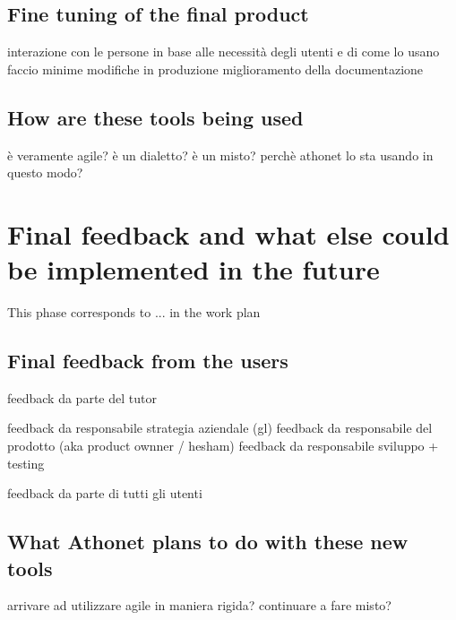 	\subsection{Fine tuning of the final product}
		interazione con le persone
		in base alle necessità degli utenti e di come lo usano faccio minime modifiche in produzione
		miglioramento della documentazione
	
	\subsection{How are these tools being used}
		è veramente agile? 
		è un dialetto?
		è un misto?
		perchè athonet lo sta usando in questo modo?

\section{Final feedback and what else could be implemented in the future}

	This phase corresponds to ... in the work plan

	\subsection{Final feedback from the users}
		feedback da parte del tutor
		
		feedback da responsabile strategia aziendale (gl)
		feedback da responsabile del prodotto (aka product ownner / hesham)
		feedback da responsabile sviluppo + testing
			
		feedback da parte di tutti gli utenti
	
	\subsection{What Athonet plans to do with these new tools}
		arrivare ad utilizzare agile in maniera rigida?
		continuare a fare misto?
